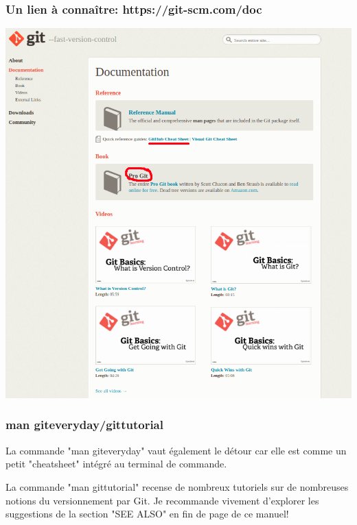\documentclass{beamer}
\begin{document}
\begin{frame}
\frametitle{Un lien à connaître: https://git-scm.com/doc}
\begin{center}
    \includegraphics[scale=0.3]{images/git_ressources/doc.png}
\end{center}
\end{frame}

\begin{frame}
\frametitle{man giteveryday/gittutorial}
La commande "man giteveryday" vaut également le détour car elle est comme un petit "cheatsheet" intégré au terminal de commande.
\bigskip

La commande "man gittutorial" recense de nombreux tutoriels sur de nombreuses notions du versionnement par Git. Je recommande vivement d'explorer les suggestions de la section "SEE ALSO" en fin de page de ce manuel!
\end{frame}



\end{document}

